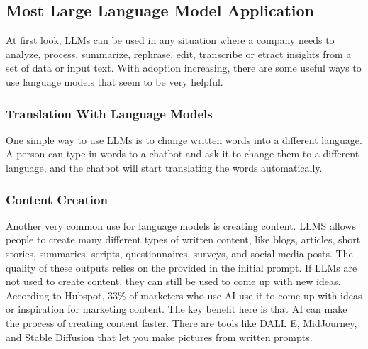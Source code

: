 \subsection{Most Large Language Model Application}
At first look, LLMs can be used in any situation where a company needs to analyze, process,  summarize, rephrase, edit, transcribe or etract insights from a set of data or input text. With adoption increasing, there are some useful ways to use language models that seem to be very helpful.
\subsubsection{Translation With Language Models}
One simple way to use LLMs is to change written words into a different language. A person can type in words to a chatbot and ask it to change them to a different language, and the chatbot will start translating the words automatically.
\subsubsection{Content Creation}
Another very common use for language models is creating content. LLMS allows people to create many different types of written content, like blogs, articles, short stories, summaries, scripts, questionnaires, surveys, and social media posts. The quality of these outputs relies on the provided in the initial prompt.
\vskip 0.5cm
If LLMs are not used to create content, they can still be used to come up with new ideas. According to Hubspot, 33\% of marketers who use AI use it to come up with ideas or inspiration for marketing content. The key benefit here is that AI can make the process of creating content faster. There are tools like DALL E, MidJourney, and Stable Diffusion that let you make pictures from written prompts.
